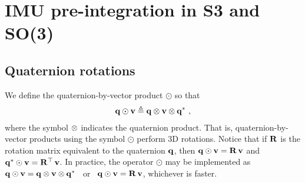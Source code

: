 

\newcommand{\bw}{{\bfomega}}
\newcommand{\bth}{{\bftheta}}
\newcommand{\bphi}{{\bfphi}}
\newcommand{\nth}{\norm{\bth}}
\newcommand{\ab}{{\bfa_b}}
\newcommand{\wb}{{\bw_b}}
\newcommand{\D}{\Delta}
\newcommand{\Dzero}{{\D^0}}
\newcommand{\Dp}{{\D\bfp}}
\newcommand{\Dv}{{\D\bfv}}
\newcommand{\Dth}{{\D\bth}}
\newcommand{\Dq}{{\D\bfq}}
\newcommand{\DR}{{\D\bfR}}
\newcommand{\DP}{{\D\bfP}}
\newcommand{\DV}{{\D\bfV}}
\newcommand{\DTH}{{\D\bfTheta}}
\newcommand{\Dw}{{\D\bw}}
\newcommand{\DW}{{\D\bfOmega}}
\newcommand{\dpp}{{\delta\bfp}}
\newcommand{\dv}{{\delta\bfv}}
\newcommand{\dth}{{\delta\bth}}
\newcommand{\dq}{{\delta\bfq}}
\newcommand{\dR}{{\delta\bfR}}
\newcommand{\dP}{{\delta\bfP}}
\newcommand{\dV}{{\delta\bfV}}
\newcommand{\dTH}{{\delta\bfTheta}}
\newcommand{\dw}{{\delta\bw}}

\newcommand{\te}{\triangleq}
\newcommand{\od}{\odot}

\newcommand{\tcom}[1]{{\footnotesize/\texttt{#1}/} }
\newcommand{\com}[1]{{\footnotesize/\texttt{#1}/~} }
\newcommand{\cdef}{\com{def}}
\newcommand{\cchain}{\com{chain}}
\newcommand{\ccross}{\com{cross}}
\newcommand{\cJr}{\com{Jr}}
\newcommand{\csmall}{\com{small}}
\newcommand{\cswap}{\com{swap}}
\newcommand{\ctrans}{\com{trans}}
\newcommand{\clog}{\com{Log}}
\newcommand{\clim}{\com{lim}}
\newcommand{\ccancel}{\com{cancel}}
\newcommand{\cexpand}{\com{expand}}
\newcommand{\csubst}{\com{subst}}

\section{IMU pre-integration in S3 and SO(3)}
\subsection{Quaternion rotations}

We define the quaternion-by-vector product $\od$ so that
%
\begin{align}
\bfq\od\bfv \te \bfq\ot\bfv\ot\bfq^*
~,
\end{align}
%
where the symbol $\otimes$ indicates the quaternion product.
That is, quaternion-by-vector products using the symbol $\od$ perform 3D rotations. 
Notice that if ${\bf R}$ is the rotation matrix equivalent to the quaternion ${\bf q}$, then $\bfq\od\bfv = \bfR\,\bfv$ and $\bfq^*\od\bfv = \bfR\tr\,\bfv$. 
In practice, the operator $\od$ may be implemented as ~$\bfq\od\bfv = \bfq\ot\bfv\ot\bfq^*$ ~or~ $\bfq\od\bfv = \bfR\,\bfv$, whichever is faster.

